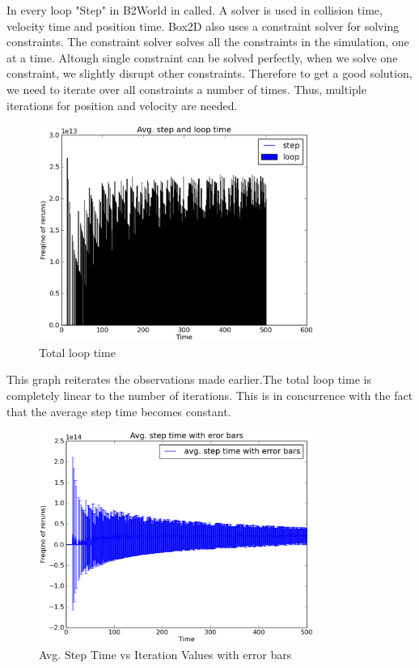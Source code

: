 \documentclass[11pt]{article}
\begin{document}
In every loop "Step" in B2World \cite{ref2} in called. A solver is used in collision time, velocity time and position time. Box2D also uses a constraint solver for solving constraints. The constraint solver solves all the constraints in the simulation, one at a time. Altough single constraint can be solved perfectly, when we solve one constraint, we slightly disrupt other constraints. Therefore to get a good solution, we need to iterate over all constraints a number of times. Thus, multiple iterations for position and velocity are needed.

\begin{figure}[ht!]
\centering
\includegraphics[width=90mm]{g32_plot01.eps}
\caption{Total loop time}
\label{overflow}
\end{figure}

This graph reiterates the observations made earlier.The total loop time is completely linear to the number of iterations. This is in concurrence with the fact that the average step time becomes constant.

\begin{figure}[ht!]
\centering
\includegraphics[width=90mm]{g32_plot03.eps}
\caption{Avg. Step Time vs Iteration Values with error bars}
\label{overflow}
\end{figure}
\end{document}
